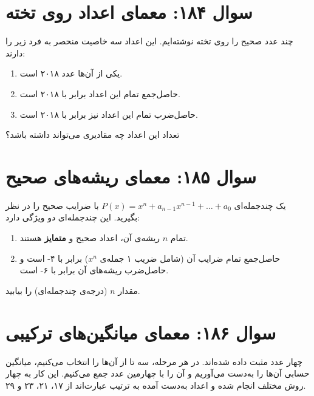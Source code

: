 \documentclass[12pt]{article}
\begin{document}
\section*{سوال ۱۸۴: معمای اعداد روی تخته}
چند عدد صحیح را روی تخته نوشته‌ایم. این اعداد سه خاصیت منحصر به فرد زیر را دارند:
\begin{enumerate}[label=(\roman*)]
	\item یکی از ‌آن‌ها عدد ۲۰۱۸ است.
	\item حاصل‌جمع تمام این اعداد برابر با ۲۰۱۸ است.
	\item حاصل‌ضرب تمام این اعداد نیز برابر با ۲۰۱۸ است.
\end{enumerate}

تعداد این اعداد چه مقادیری می‌تواند داشته باشد؟


\vspace{1cm}
\hrulefill
\vspace{1cm}

\section*{سوال ۱۸۵: معمای ریشه‌های صحیح}
یک چندجمله‌ای \( P(x) = x^n + a_{n-1}x^{n-1} + \dots + a_0 \) با ضرایب صحیح را در نظر بگیرید. این چندجمله‌ای دو ویژگی دارد:
\begin{enumerate}[label=(\roman*)]
	\item تمام \(n\) ریشه‌ی آن، اعداد صحیح و \textbf{متمایز} هستند.
	\item حاصل‌جمع تمام ضرایب آن (شامل ضریب ۱ جمله‌ی \(x^n\)) برابر با ۴- است و حاصل‌ضرب ریشه‌های آن برابر با ۶- است.
\end{enumerate}

مقدار \(n\) (درجه‌ی چندجمله‌ای) را بیابید.



\vspace{1cm}
\hrulefill
\vspace{1cm}

\section*{سوال ۱۸۶: معمای میانگین‌های ترکیبی}
چهار عدد مثبت داده شده‌اند. در هر مرحله، سه تا از ‌آن‌ها را انتخاب می‌کنیم، میانگین حسابی ‌آن‌ها را به‌دست می‌آوریم و ‌آن‌ را با چهارمین عدد جمع می‌کنیم. این کار به چهار روش مختلف انجام شده و اعداد به‌دست ‌آمده به ترتیب عبارت‌اند از ۱۷، ۲۱، ۲۳ و ۲۹.
\end{document}
